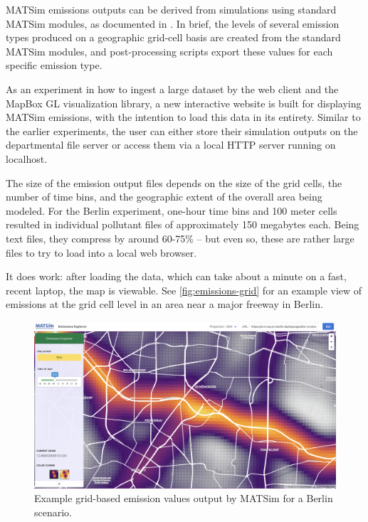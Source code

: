MATSim emissions outputs can be derived from simulations using standard MATSim modules, as documented in \cite{Kickhoefer2015EmissionModeling}. In brief, the levels of several emission types produced on a geographic grid-cell basis are created from the standard MATSim modules, and post-processing scripts export these values for each specific emission type.

As an experiment in how to ingest a large dataset by the web client and the MapBox GL visualization library, a new interactive website is built for displaying MATSim emissions, with the intention to load this data in its entirety. Similar to the earlier experiments, the user can either store their simulation outputs on the departmental file server or access them via a local HTTP server running on localhost.

The size of the emission output files depends on the size of the grid cells, the number of time bins, and the geographic extent of the overall area being modeled. For the Berlin experiment, one-hour time bins and 100 meter cells resulted in individual pollutant files of approximately 150 megabytes each. Being text files, they compress by around 60-75\% -- but even so, these are rather large files to try to load into a local web browser.

It does work: after loading the data, which can take about a minute on a fast, recent laptop, the map is viewable. See \autoref{fig:emissions-grid} for an example view of emissions at the grid cell level in an area near a major freeway in Berlin.

\begin{figure}[!ht]
  \includegraphics[width=\textwidth]{chapters/12-server-experiments/images/emissions-grid.png}
  \caption{Example grid-based emission values output by MATSim for a Berlin scenario.}
  \label{fig:emissions-grid}
\end{figure}

